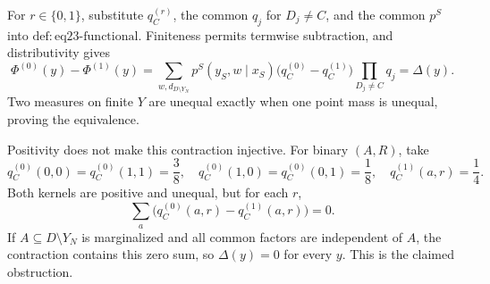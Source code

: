 For \(r\in\{0,1\}\), substitute \(q_C^{(r)}\), the common \(q_j\) for \(D_j\ne C\), and the common \(p^S\) into \(\mathrm{def:eq23\text{-}functional}\). Finiteness permits termwise subtraction, and distributivity gives
\[
 \Phi^{(0)}(y)-\Phi^{(1)}(y)
 =\sum_{w,d_{D\setminus Y_N}}
 p^S(y_S,w\mid x_S)
 \bigl(q_C^{(0)}-q_C^{(1)}\bigr)
 \prod_{D_j\ne C}q_j
 =\Delta(y).
\]
Two measures on finite \(Y\) are unequal exactly when one point mass is unequal, proving the equivalence.

Positivity does not make this contraction injective. For binary \((A,R)\), take
\[
 q_C^{(0)}(0,0)=q_C^{(0)}(1,1)=\frac38,\quad
 q_C^{(0)}(1,0)=q_C^{(0)}(0,1)=\frac18,\quad
 q_C^{(1)}(a,r)=\frac14.
\]
Both kernels are positive and unequal, but for each \(r\),
\[
 \sum_a\bigl(q_C^{(0)}(a,r)-q_C^{(1)}(a,r)\bigr)=0.
\]
If \(A\subseteq D\setminus Y_N\) is marginalized and all common factors are independent of \(A\), the contraction contains this zero sum, so \(\Delta(y)=0\) for every \(y\). This is the claimed obstruction.